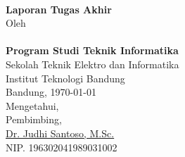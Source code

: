 \clearpage
\pagestyle{empty}

\begin{center}

    \large{\bfseries \MakeUppercase{\thetitle}}
    \\[2\baselineskip]

    \large{\textbf{Laporan Tugas Akhir}}
    \\[2\baselineskip]

    \normalsize{Oleh\\
    \MakeUppercase{\textbf{\theauthor}}\\
    \textbf{Program Studi Teknik Informatika} \\
    Sekolah Teknik Elektro dan Informatika \\
    Institut Teknologi Bandung}
    \\[4\baselineskip]


    \normalsize{Bandung, \today \\
    Mengetahui, \\[1\baselineskip]
    Pembimbing,\\[4\baselineskip]
    \underline{Dr. Judhi Santoso, M.Sc.}\\
    NIP. 196302041989031002}

\end{center}
\clearpage
